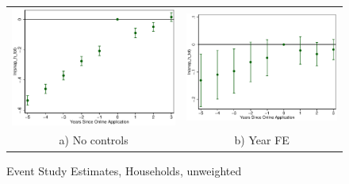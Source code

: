 \documentclass[11pt,letterpaper]{article}
\begin{document}
\begin{figure}\caption{Event Study Estimates, Households, unweighted}
\begin{tabular}{cc}
\includegraphics[scale=0.57]{tabfig/evstu_snap_h_tot_one_notr_5_3}&\includegraphics[scale=0.57]{tabfig/evstu_snap_h_tot_one_year_5_3}\\
a) No controls&b) Year FE\\

\end{tabular}
\end{figure}
\end{document}
